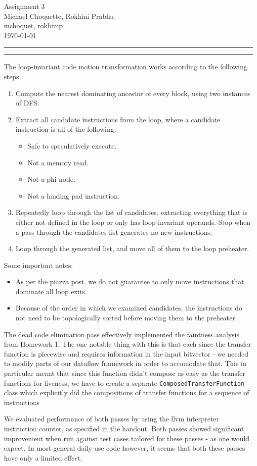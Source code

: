 \documentclass[11pt]{article}
\newcounter{questionCounter}
\newcounter{partCounter}[questionCounter]
\newenvironment{question}[2][\arabic{questionCounter}]{%
    \setcounter{partCounter}{0}%
    \vspace{.25in} \hrule \vspace{0.5em}%
        \noindent{\bf #2}%
    \vspace{0.8em} \hrule \vspace{.10in}%
    \addtocounter{questionCounter}{1}%
}{}
\newcommand{\myname}{Michael Choquette, Rokhini Prabhu}
\newcommand{\myandrew}{mchoquet, rokhinip}
\newcommand{\myhwname}{Assignment 3}
\begin{document}
\thispagestyle{plain}

\begin{center}
{\Large \myhwname} \\
\myname \\
\myandrew \\
\today
\end{center}

\begin{question}{Implementation Notes}

The loop-invariant code motion transformation works according to the following steps:
\begin{enumerate}
\item	Compute the nearest dominating ancestor of every block, using two instances of DFS.
\item	Extract all candidate instructions from the loop, where a candidate instruction is all of the following:
	\begin{itemize}
	\item Safe to speculatively execute.
	\item Not a memory read.
	\item	Not a phi node.
	\item	Not a landing pad instruction.
	\end{itemize}
\item Repeatedly loop through the list of candidates, extracting everything that is either not defined in the loop or only has loop-invariant operands. Stop when a pass through the candidates list generates no new instructions.
\item Loop through the generated list, and move all of them to the loop preheater.
\end{enumerate}
Some important notes:
\begin{itemize}
\item	As per the piazza post, we do not guarantee to only move instructions that dominate all loop exits.
\item	Because of the order in which we examined candidates, the instructions do not need to be topologically sorted before moving them to the preheater.
\end{itemize}

The dead code elimination pass effectively implemented the faintness analysis
from Homework 1. The one notable thing with this is that each since the transfer
function is piecewise and requires information in the input bitvector - we
needed to modify parts of our dataflow framework in order to accomodate that.
This in particular meant that since this function didn't compose as easy as the
transfer functions for liveness, we have to create a separate
\texttt{ComposedTransferFunction} class which explicitly did the compositions of
transfer functions for a sequence of instructions

We evaluated performance of both passes by using the llvm interpreter instruction 
counter, as specified in the handout. Both passes showed significant improvement
when run against test cases tailored for these passes - as one would expect. In
most general daily-use code however, it seems that both these passes have only a
limited effect.

\end{question}
\end{document}
